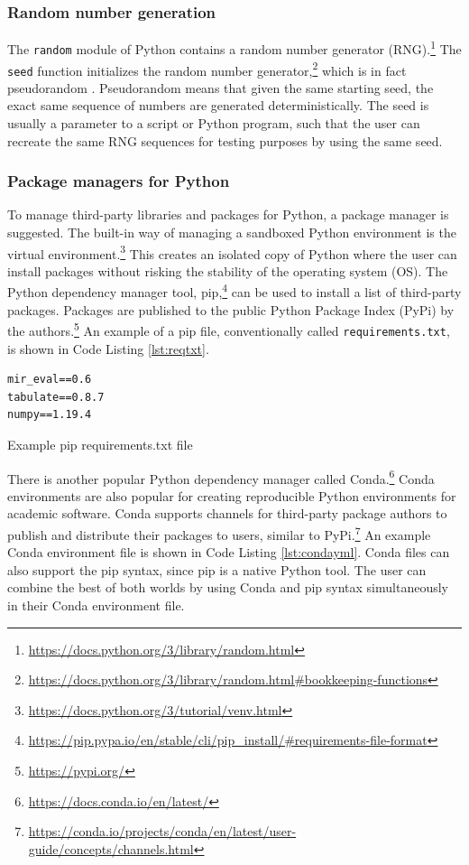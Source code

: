 \documentclass[report.tex]{subfiles}
\begin{document}
\subsubsection{Random number generation}
\label{sec:pyrng}

The \Verb#random# module of Python contains a random number generator (RNG).\footnote{\url{https://docs.python.org/3/library/random.html}} The \Verb#seed# function initializes the random number generator,\footnote{\url{https://docs.python.org/3/library/random.html\#bookkeeping-functions}} which is in fact pseudorandom \parencite{pseudorng}. Pseudorandom means that given the same starting seed, the exact same sequence of numbers are generated deterministically. The seed is usually a parameter to a script or Python program, such that the user can recreate the same RNG sequences for testing purposes by using the same seed.

\subsubsection{Package managers for Python}

To manage third-party libraries and packages for Python, a package manager is suggested. The built-in way of managing a sandboxed Python environment is the virtual environment.\footnote{\url{https://docs.python.org/3/tutorial/venv.html}} This creates an isolated copy of Python where the user can install packages without risking the stability of the operating system (OS). The Python dependency manager tool, pip,\footnote{\url{https://pip.pypa.io/en/stable/cli/pip_install/\#requirements-file-format}} can be used to install a list of third-party packages. Packages are published to the public Python Package Index (PyPi) by the authors.\footnote{\url{https://pypi.org/}} An example of a pip file, conventionally called \Verb#requirements.txt#, is shown in Code Listing \ref{lst:reqtxt}.

\begin{listing}[ht]
\centering
\begin{BVerbatim}
mir_eval==0.6
tabulate==0.8.7
numpy==1.19.4
\end{BVerbatim}
	\caption{Example pip requirements.txt file}
	\label{lst:reqtxt}
\end{listing}

There is another popular Python dependency manager called Conda.\footnote{\url{https://docs.conda.io/en/latest/}} Conda environments are also popular for creating reproducible Python environments for academic software. Conda supports channels for third-party package authors to publish and distribute their packages to users, similar to PyPi.\footnote{\url{https://conda.io/projects/conda/en/latest/user-guide/concepts/channels.html}} An example Conda environment file is shown in Code Listing \ref{lst:condayml}. Conda files can also support the pip syntax, since pip is a native Python tool. The user can combine the best of both worlds by using Conda and pip syntax simultaneously in their Conda environment file.
\end{document}
